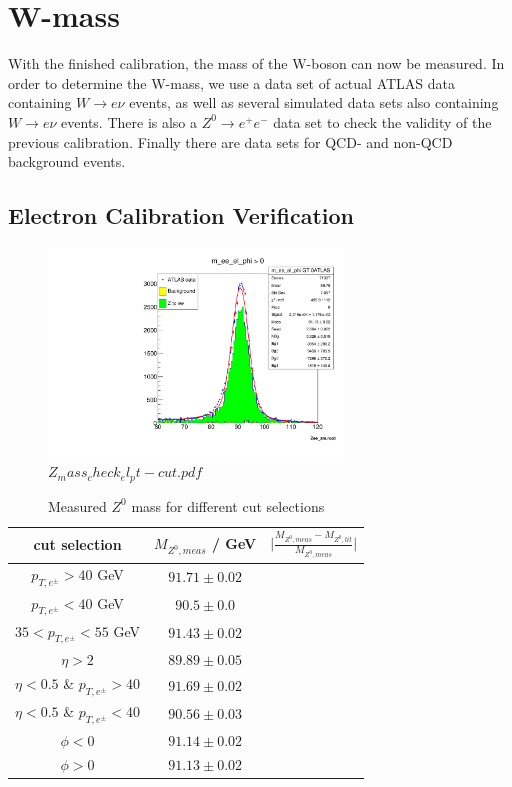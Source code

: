 \section{W-mass}
\label{sec:w-mass}
With the finished calibration, the mass of the W-boson can now be measured. 
In order to determine the W-mass, we use a data set of actual ATLAS data containing $W \rightarrow e\nu$ events,
as well as several simulated data sets also containing $W \rightarrow e\nu$ events. 
There is also a $Z^0 \rightarrow e^+e^-$ data set to check the validity of the previous calibration. Finally there are data sets for QCD- and non-QCD background events.

\subsection{Electron Calibration Verification}

\begin{figure}[H]
    \centering
    \includegraphics[width=0.7\textwidth]{../W_mass/Z_mass_check_phi_positive.pdf}
    \caption{$Z_mass_check_el_pt-cut.pdf$}
    \label{fig:z-mass_check}
\end{figure}

\begin{table}
    \centering
    \begin{tabular}{ccc}
        \toprule
        \toprule
        cut selection & $M_{Z^0,meas}$ / GeV & $\bigl| \frac{M_{Z^0,meas}- M_{Z^0,lit}}{M_{Z^0,meas}} \bigr|$ \\
        \midrule
        $p_{T,e^{\pm}} > 40$ GeV & $91.71 \pm 0.02$ & \\
        $p_{T,e^{\pm}} < 40$ GeV & $90.5 \pm 0.0$ & \\
        $35 < p_{T,e^{\pm}} < 55$ GeV & $91.43 \pm 0.02$ & \\
        $\eta > 2$ & $89.89 \pm 0.05$ & \\
        $\eta < 0.5$ \& $p_{T,e^{\pm}} > 40$ & $91.69 \pm 0.02$ & \\
        $\eta < 0.5$ \& $p_{T,e^{\pm}} < 40$ & $90.56 \pm 0.03$ & \\
        $\phi < 0$ & $91.14 \pm 0.02$ & \\
        $\phi > 0$ & $91.13 \pm 0.02$ & \\
        \bottomrule
        \bottomrule
    \end{tabular}
    \caption{Measured $Z^0$ mass for different cut selections}
    \label{tab:z-masses}
\end{table}


